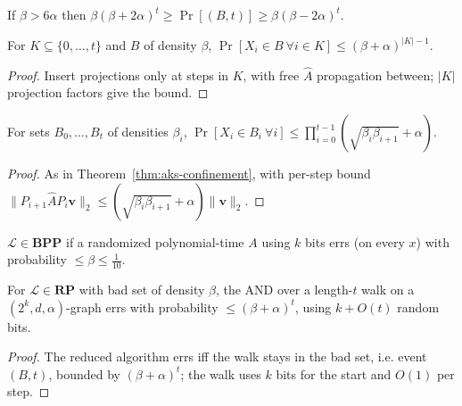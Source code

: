 \begin{theorem}
  \label{thm:aks-lower-bound}
  \notready
  If $\beta>6\alpha$ then
  $\beta(\beta+2\alpha)^t\ge\Pr[(B,t)]\ge\beta(\beta-2\alpha)^t$.
\end{theorem}

\begin{theorem}
  \label{thm:time-confinement}
  For $K\subseteq\{0,\dots,t\}$ and $B$ of density $\beta$,
  $\Pr[X_i\in B\ \forall i\in K]\le(\beta+\alpha)^{|K|-1}$.
\end{theorem}
\begin{proof}
  Insert projections only at steps in $K$, with free $\hat A$ propagation
  between; $|K|$ projection factors give the bound.
\end{proof}

\begin{theorem}
  \label{thm:varying-confinement}
  For sets $B_0,\dots,B_t$ of densities $\beta_i$,
  $\Pr[X_i\in B_i\ \forall i]\le\prod_{i=0}^{t-1}(\sqrt{\beta_i\beta_{i+1}}+\alpha)$.
\end{theorem}
\begin{proof}
  As in Theorem~\ref{thm:aks-confinement}, with per-step bound
  $\|P_{i+1}\hat A P_i\mathbf v\|_2\le(\sqrt{\beta_i\beta_{i+1}}+\alpha)\|\mathbf
  v\|_2$.
\end{proof}

\begin{definition}
  \label{def:bpp-class}
  $\mathcal L\in\mathbf{BPP}$ if a randomized polynomial-time $A$ using $k$ bits
  errs (on every $x$) with probability $\le\beta\le\tfrac1{10}$.
\end{definition}

\begin{theorem}
  \label{thm:one-sided-reduction}
  For $\mathcal L\in\mathbf{RP}$ with bad set of density $\beta$, the AND over a
  length-$t$ walk on a $(2^k,d,\alpha)$-graph errs with probability
  $\le(\beta+\alpha)^t$, using $k+O(t)$ random bits.
\end{theorem}
\begin{proof}
  The reduced algorithm errs iff the walk stays in the bad set, i.e. event
  $(B,t)$, bounded by $(\beta+\alpha)^t$; the walk uses $k$ bits for the start
  and $O(1)$ per step.
\end{proof}

